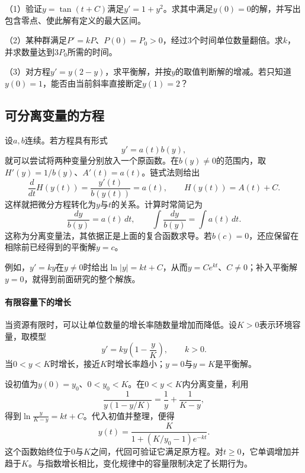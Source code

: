 \begin{exercise}
\mbox{}\par\nobreak

（1）验证\(y=\tan(t+C)\)满足\(y'=1+y^2\)。求其中满足\(y(0)=0\)的解，并写出包含零点、使此解有定义的最大区间。

（2）某种群满足\(P'=kP\)、\(P(0)=P_0>0\)，经过\(3\)个时间单位数量翻倍。求\(k\)，并求数量达到\(3P_0\)所需的时间。

（3）对方程\(y'=y(2-y)\)，求平衡解，并按\(y\)的取值判断解的增减。若只知道\(y(0)=1\)，能否由当前斜率直接断定\(y(1)=2\)？
\end{exercise}

\subsection{可分离变量的方程}

设\(a,b\)连续。若方程具有形式
\begin{equation*}
 y'=a(t)b(y),
\end{equation*}
就可以尝试将两种变量分别放入一个原函数。在\(b(y)\ne0\)的范围内，取\(H'(y)=1/b(y)\)、\(A'(t)=a(t)\)。链式法则给出
\begin{equation*}
 \frac{d}{dt}H(y(t))=\frac{y'(t)}{b(y(t))}=a(t),
 \qquad H(y(t))=A(t)+C.
\end{equation*}
这样就把微分方程转化为\(y\)与\(t\)的关系。计算时常简记为
\begin{equation}\label{eq:calculus-ode-separation}
 \frac{dy}{b(y)}=a(t)\,dt,
 \qquad \int\frac{dy}{b(y)}=\int a(t)\,dt.
\end{equation}
这称为{\heiti{}分离变量法}，其依据正是上面的复合函数求导。若\(b(c)=0\)，还应保留在相除前已经得到的平衡解\(y=c\)。

例如，\(y'=ky\)在\(y\ne0\)时给出\(\ln|y|=kt+C\)，从而\(y=Ce^{kt}\)、\(C\ne0\)；补入平衡解\(y=0\)，就得到前面研究的整个解族。

\paragraph{有限容量下的增长} \mbox{}

当资源有限时，可以让单位数量的增长率随数量增加而降低。设\(K>0\)表示环境容量，取模型
\begin{equation}\label{eq:calculus-logistic-equation}
 y'=ky\left(1-\frac yK\right),\qquad k>0.
\end{equation}
当\(0<y<K\)时增长，接近\(K\)时增长率趋小；\(y=0\)与\(y=K\)是平衡解。

设初值为\(y(0)=y_0\)、\(0<y_0<K\)。在\(0<y<K\)内分离变量，利用
\begin{equation*}
 \frac1{y(1-y/K)}=\frac1y+\frac1{K-y},
\end{equation*}
得到\(\ln\frac{y}{K-y}=kt+C\)。代入初值并整理，便得
\begin{equation}\label{eq:calculus-logistic-solution}
 y(t)=\frac{K}{1+(K/y_0-1)e^{-kt}}.
\end{equation}
这个函数始终位于\(0\)与\(K\)之间，代回可验证它满足原方程。对\(t\ge0\)，它单调增加并趋于\(K\)。与指数增长相比，变化规律中的容量限制决定了长期行为。

